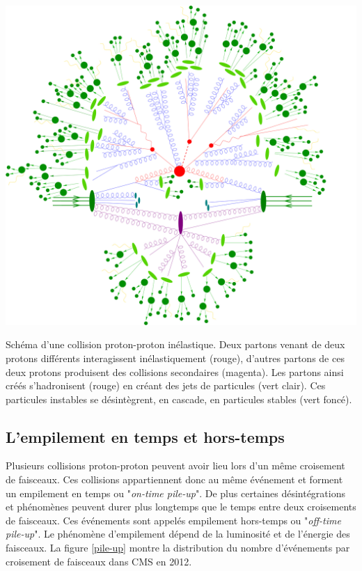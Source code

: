\begin{minipagewithmarginpars}[ht!]{0.95\textwidth}
	\centering
	\includegraphics[width=1.0\textwidth]{LHC/event.jpg}
	\captionsetup{type=figure}\caption{Schéma d'une collision proton-proton inélastique. Deux partons venant de deux protons différents interagissent inélastiquement (rouge), d'autres partons de ces deux protons produisent des collisions secondaires (magenta). Les partons ainsi créés s'hadronisent (rouge) en créant des jets de particules (vert clair). Ces particules instables se désintègrent, en cascade, en particules stables (vert foncé).}
	\label{collision2}	
\end{minipagewithmarginpars}

\subsection{L'empilement en temps et hors-temps}
Plusieurs collisions proton-proton peuvent avoir lieu lors d'un même croisement de faisceaux. Ces collisions appartiennent donc au même événement et forment un empilement en temps ou "\textit{on-time pile-up}". De plus certaines désintégrations et phénomènes peuvent durer plus longtemps que le temps entre deux croisements de faisceaux. Ces événements sont appelés empilement hors-temps ou "\textit{off-time pile-up}". Le phénomène d'empilement dépend de la luminosité et de l'énergie des faisceaux. La figure \ref{pile-up} montre la distribution du nombre d'événements par croisement de faisceaux dans CMS en \num{2012}.

